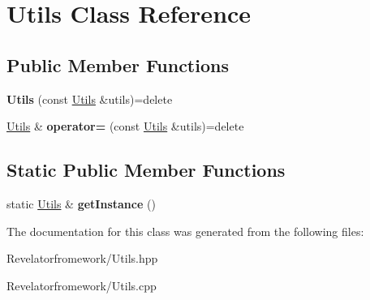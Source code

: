 \hypertarget{class_utils}{\section{Utils Class Reference}
\label{class_utils}
}
\subsection*{Public Member Functions}
\begin{DoxyCompactItemize}
\item 
\hypertarget{class_utils_a1653aff7c075a5dd590d479d9b62242d}{{\bfseries Utils} (const \hyperlink{class_utils}{Utils} \&utils)=delete}\label{class_utils_a1653aff7c075a5dd590d479d9b62242d}

\item 
\hypertarget{class_utils_add93043cabc33d69f58b083f0e618849}{\hyperlink{class_utils}{Utils} \& {\bfseries operator=} (const \hyperlink{class_utils}{Utils} \&utils)=delete}\label{class_utils_add93043cabc33d69f58b083f0e618849}

\end{DoxyCompactItemize}
\subsection*{Static Public Member Functions}
\begin{DoxyCompactItemize}
\item 
\hypertarget{class_utils_ad50ce773764e9114decc8c415cd38d3e}{static \hyperlink{class_utils}{Utils} \& {\bfseries get\-Instance} ()}\label{class_utils_ad50ce773764e9114decc8c415cd38d3e}

\end{DoxyCompactItemize}


The documentation for this class was generated from the following files\-:\begin{DoxyCompactItemize}
\item 
Revelatorfromework/Utils.\-hpp\item 
Revelatorfromework/Utils.\-cpp\end{DoxyCompactItemize}
